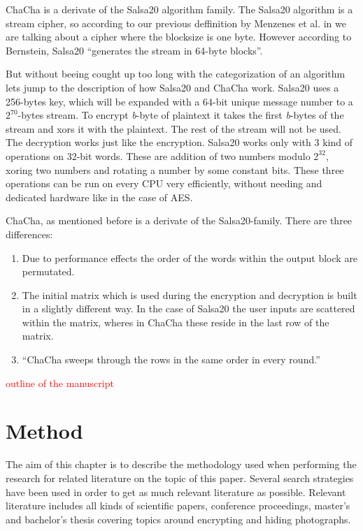 \documentclass[12pt,a4paper,titlepage,oneside]{scrartcl}
\newcommand\todo[1]{\textcolor{red}{#1}}
\begin{document}
ChaCha is a derivate of the Salsa20 algorithm family. 
The Salsa20 algorithm is a stream cipher, so according to our previous deffinition by Menzenes et al. in \cite{menezes1996handbook} we are talking about a cipher where the blocksize is one byte.
However according to Bernstein, Salsa20 ``generates the stream in 64-byte blocks''. \cite{bernstein2008salsa20}

But without beeing cought up too long with the categorization of an algorithm lets jump to the description of how Salsa20 and ChaCha work.
Salsa20 uses a 256-bytes key, which will be expanded with a 64-bit unique message number to a \begin{math} 2^{70} \end{math}-bytes stream.
To encrypt \textit{b}-byte of plaintext it takes the first \textit{b}-bytes of the stream and xors it with the plaintext.
The rest of the stream will not be used.
The decryption works just like the encryption.
Salsa20 works only with 3 kind of operations on 32-bit words.
These are addition of two numbers modulo \begin{math} 2^{32} \end{math}, xoring two numbers and rotating a number by some constant bits.
These three operations can be run on every CPU very efficiently, without needing and dedicated hardware like in the case of AES. \cite{bernstein2008salsa20}

ChaCha, as mentioned before is a derivate of the Salsa20-family.
There are three differences:
\begin{enumerate}
  \item Due to performance effects the order of the words within the output block are permutated.
  \item The initial matrix which is used during the encryption and decryption is built in a slightly different way.
    In the case of Salsa20 the user inputs are scattered within the matrix, wheres in ChaCha these reside in the last row of the matrix.
  \item ``ChaCha sweeps through the rows in the same order in every round.''
\end{enumerate}
\cite{bernstein2008chacha}

\todo{outline of the manuscript}


\newpage
\section{Method}
The aim of this chapter is to describe the methodology used when performing the research for related literature on the topic of this paper.
Several search strategies have been used in order to get as much relevant literature as possible.
Relevant literature includes all kinds of scientific papers, conference proceedings, master's and bachelor's thesis covering topics around encrypting and hiding photographs.
\end{document}
